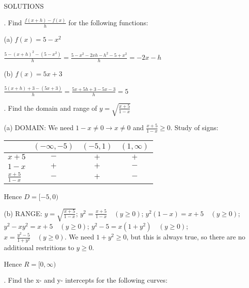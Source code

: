 \documentclass{article}
\begin{document}
\setlength{\unitlength}{1mm}
\pagestyle{myheadings}
\bigskip

\centerline{SOLUTIONS}

\bigskip


\bigskip
{}. Find $\displaystyle \frac {f(x+h)-f(x)} {h}$ 
for the following functions:

\noindent (a) $f(x) = 5-x^2$

$\displaystyle 
\frac {5-(x+h)^2-(5-x^2)} {h} = \frac {5-x^2-2xh-h^2-5+x^2} {h}
= -2x-h
$

\bigskip

\noindent (b) $f(x) = 5x+3$

$\displaystyle 
\frac {5(x+h)+3-(5x+3)} {h} = \frac {5x+5h+3-5x-3} {h} = 5
$

\bigskip

\medskip

. Find the domain and range of 
$\displaystyle y = \sqrt{\frac {x+5}{1-x}}$

\noindent (a) DOMAIN: We need $1-x\neq 0 \rightarrow x\neq 0$ and 
$\frac {x+5} {1-x} \geq 0$. Study of signs: 

\begin{center}
\begin{tabular}{|l|c|c|c|}
\hline
&$(-\infty,-5)$ & $(-5,1)$ & $(1,\infty)$\\
\hline
$x+5$ & $-$ & $+$ & $+$\\
\hline
$1-x$ & $+$ & $+$ & $-$\\
\hline
$\frac {x+5} {1-x}$ & $-$ & $+$ & $-$\\
\hline
\end{tabular}
\end{center}

Hence $D = [-5,0)$

\noindent (b) RANGE: $\displaystyle y = \sqrt{\frac {x+5}{1-x}}$; 
$\displaystyle y^2 = \frac {x+5}{1-x} \quad (y\geq 0)$;
$\displaystyle y^2 (1-x) = x+5 \quad (y\geq 0)$;
$\displaystyle y^2 - xy^2 = x+5 \quad (y\geq 0)$;
$\displaystyle y^2 - 5 = x (1+y^2) \quad (y\geq 0)$; 
$\displaystyle x = \frac {y^2-5} {1+y^2} \quad (y\geq 0)$. 
We need $\displaystyle 1+y^2 \geq 0$, but this is always true, 
so there are no additional restritions to $y\geq 0$. 

Hence $R = [0,\infty)$

\medskip

. Find the x- and y- intercepts for the following curves:
\end{document}
